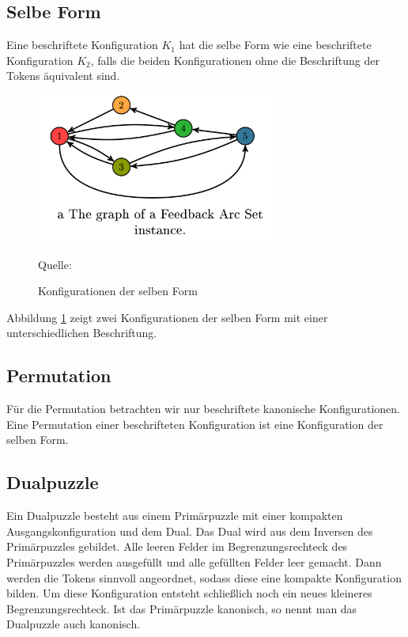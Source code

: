 \documentclass[seminar,german]{algothesis}
\newcommand*{\quelle}{%
  \footnotesize Quelle:
}
\begin{document}
\subsection{Selbe Form}
\begin{definition}
Eine beschriftete Konfiguration $K_1$ hat die selbe Form wie eine beschriftete Konfiguration $K_2$, falls die beiden Konfigurationen ohne die Beschriftung der Tokens äquivalent sind.
\end{definition}
\begin{figure}[ht]
	\centering
	\includegraphics[width=0.7\textwidth]{graph}
	\caption{Konfigurationen der selben Form}
	\quelle \cite{akitaya2022pushing}
	\label{fig:10}
\end{figure}
\noindent Abbildung \ref{fig:10} zeigt zwei Konfigurationen der selben Form mit einer unterschiedlichen Beschriftung. 
\subsection{Permutation}
\begin{definition}
Für die Permutation betrachten wir nur beschriftete kanonische Konfigurationen. Eine Permutation einer beschrifteten Konfiguration ist eine Konfiguration der selben Form.
\end{definition}
\subsection{Dualpuzzle}
Ein Dualpuzzle besteht aus einem Primärpuzzle mit einer kompakten Ausgangskonfiguration und dem Dual. Das Dual wird aus dem Inversen des Primärpuzzles gebildet. Alle leeren Felder im Begrenzungsrechteck des Primärpuzzles werden ausgefüllt und alle gefüllten Felder leer gemacht. Dann werden die Tokens sinnvoll angeordnet, sodass diese eine kompakte Konfiguration bilden. Um diese Konfiguration entsteht schließlich noch ein neues kleineres Begrenzungsrechteck. Ist das Primärpuzzle kanonisch, so nennt man das Dualpuzzle auch kanonisch.
\end{document}
